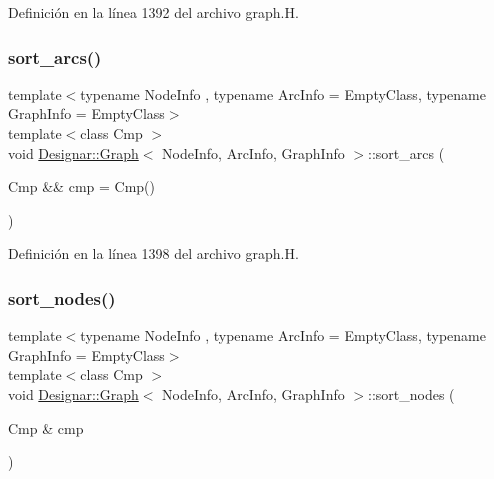 Definición en la línea 1392 del archivo graph.\+H.

\mbox{\label{class_designar_1_1_graph_a37b5e36c96bf9efe44a0d6b83feb9656}} 
\subsubsection{\texorpdfstring{sort\+\_\+arcs()}{sort\_arcs()}\hspace{0.1cm}{\footnotesize\ttfamily [2/2]}}
{\footnotesize\ttfamily template$<$typename Node\+Info , typename Arc\+Info  = Empty\+Class, typename Graph\+Info  = Empty\+Class$>$ \\
template$<$class Cmp $>$ \\
void \hyperlink{class_designar_1_1_graph}{Designar\+::\+Graph}$<$ Node\+Info, Arc\+Info, Graph\+Info $>$\+::sort\+\_\+arcs (\begin{DoxyParamCaption}\item[{Cmp \&\&}]{cmp = {\ttfamily Cmp()} }\end{DoxyParamCaption})\hspace{0.3cm}{\ttfamily [inline]}}



Definición en la línea 1398 del archivo graph.\+H.

\mbox{\label{class_designar_1_1_graph_afcdce423516a879b23ec1b0fed201f20}} 
\subsubsection{\texorpdfstring{sort\+\_\+nodes()}{sort\_nodes()}\hspace{0.1cm}{\footnotesize\ttfamily [1/2]}}
{\footnotesize\ttfamily template$<$typename Node\+Info , typename Arc\+Info  = Empty\+Class, typename Graph\+Info  = Empty\+Class$>$ \\
template$<$class Cmp $>$ \\
void \hyperlink{class_designar_1_1_graph}{Designar\+::\+Graph}$<$ Node\+Info, Arc\+Info, Graph\+Info $>$\+::sort\+\_\+nodes (\begin{DoxyParamCaption}\item[{Cmp \&}]{cmp }\end{DoxyParamCaption})\hspace{0.3cm}{\ttfamily [inline]}}



